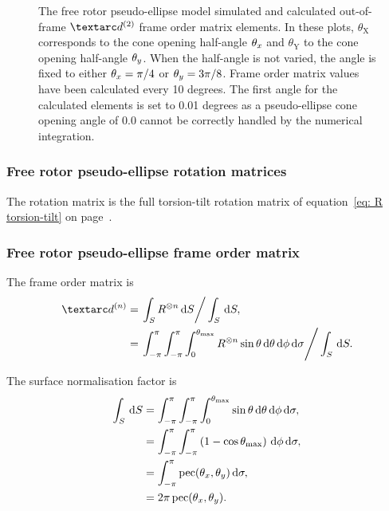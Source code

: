 \begin{figure}
\begin{tabular}{@{}cc@{}}
  \end{tabular}
  \caption[Free rotor pseudo-ellipse simulated and calculated out-of-frame $\FOtwo$ elements.]{
    The free rotor pseudo-ellipse model simulated and calculated out-of-frame $\FOtwo$ frame order matrix elements.
    In these plots, $\theta_\textrm{X}$ corresponds to the cone opening half-angle $\theta_x$ and $\theta_\textrm{Y}$ to the cone opening half-angle $\theta_y$.
    When the half-angle is not varied, the angle is fixed to either $\theta_x = \pi/4$ or $\theta_y = 3\pi/8$.
    Frame order matrix values have been calculated every 10 degrees.
    The first angle for the calculated elements is set to 0.01 degrees as a pseudo-ellipse cone opening angle of 0.0 cannot be correctly handled by the numerical integration.
  }
  \label{fig: simulated and calculated out-of-frame 2nd degree pseudo-ellipse, free rotor frame order}
\end{figure}


\subsubsection{Free rotor pseudo-ellipse rotation matrices}

The rotation matrix is the full torsion-tilt rotation matrix of equation~\ref{eq: R torsion-tilt} on page~\pageref{eq: R torsion-tilt}.


\subsubsection{Free rotor pseudo-ellipse frame order matrix}

The frame order matrix is
\begin{subequations}
\begin{align}
    \FOn &= \left. \int_S R^{\otimes n} \diff S \right / \int_S \diff S , \\
         &= \left. \int_{-\pi}^{\pi} \int_{-\pi}^{\pi} \int_{0}^{\conethetamax} R^{\otimes n} \sin\theta \diff\theta \diff\phi \diff\sigma  \right / \int_S \diff S .
\end{align}
\end{subequations}

The surface normalisation factor is
\begin{subequations}
\begin{align}
    \int_S \,\mathrm{d} S &= \int_{-\pi}^{\pi} \int_{-\pi}^{\pi} \int_{0}^{\theta_\textrm{max}} \sin\theta \,\mathrm{d}\theta \,\mathrm{d}\phi \,\mathrm{d}\sigma , \\
                   &= \int_{-\pi}^{\pi} \int_{-\pi}^{\pi} \left( 1 - \cos\theta_\textrm{max} \right) \,\mathrm{d}\phi \,\mathrm{d}\sigma , \\
                   &= \int_{-\pi}^{\pi} \operatorname{pec}(\theta_x, \theta_y) \,\mathrm{d}\sigma , \\
                   &= 2\pi \operatorname{pec}(\theta_x, \theta_y) .
\end{align}
\end{subequations}


